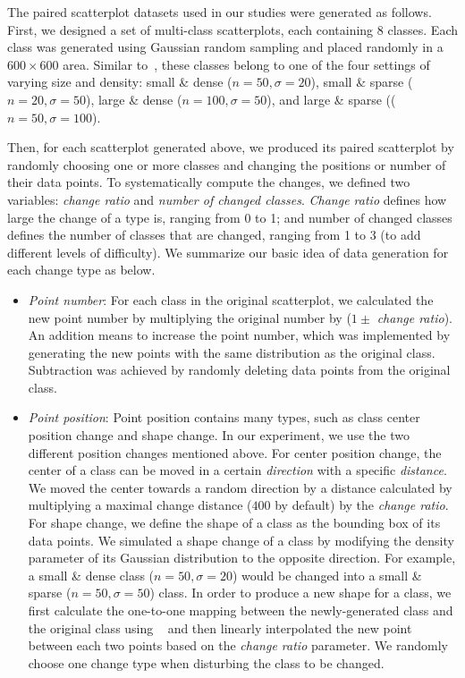 \vspace{.3em}
The paired scatterplot datasets used in our studies were generated as follows.
First, we designed a set of multi-class scatterplots, each containing $8$ classes. Each class was generated using Gaussian random sampling and placed randomly in a $600 \times 600$ area.
Similar to~\cite{Lu21}, these classes belong to one of the four settings of varying size and density: small \& dense ($n=50, \sigma=20$), small \& sparse ($n=20, \sigma=50$),  large \& dense ($n=100, \sigma=50$), and large \& sparse (($n=50, \sigma=100$).

Then, for each scatterplot generated above, we produced its paired scatterplot by randomly choosing one or more classes and changing the positions or number of their data points.
To systematically compute the changes, we defined two variables: \emph{change ratio} and \emph{number of changed classes}.
\emph{Change ratio} defines how large the change of a type is, ranging from 0 to 1; and {number of changed classes} defines the number of classes that are changed, ranging from 1 to 3 (to add
different levels of difficulty). We summarize our basic idea of data generation for each change type as below.
\begin{itemize}

     \item \emph{Point number}: For each class in the original scatterplot,  we calculated the new point number by multiplying the original number by ($1 \pm$ \emph{change ratio}). An addition means to increase the point number, which was implemented by generating the new points with the same distribution as the original class. Subtraction was achieved by randomly deleting data points from the original class.

     \item \emph{Point position}: Point position contains many types, such as class center position change and shape change. In our experiment, we use the two different position changes mentioned above. For center position change, the center of a class can be moved in a certain \emph{direction} with a specific \emph{distance}. We moved the center towards a random direction by a distance calculated by multiplying a maximal change distance ($400$ by default) by the \emph{change ratio}. For shape change, we define the shape of a class as the bounding box of its data points. We simulated a shape change of a class by modifying the density parameter of its Gaussian distribution to the opposite direction. For example, a small \& dense class ($n=50, \sigma=20$) would be changed into a small \& sparse ($n=50, \sigma=50$) class. In order to produce a new shape for a class, we first calculate the one-to-one mapping between the newly-generated class and the original class using ~\cite{kuhn1955hungarian} and then linearly interpolated the new point between each two points based on the \emph{change ratio} parameter. We randomly choose one change type when disturbing the class to be changed.
\end{itemize}
